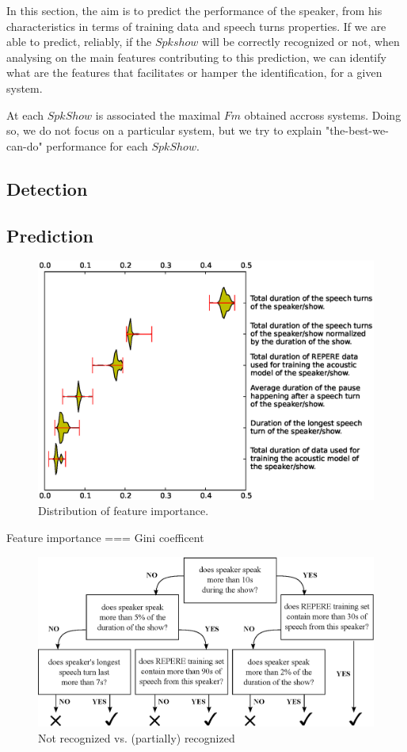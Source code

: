 In this section, the aim is to predict the performance of the speaker, from his characteristics in terms of training data and speech turns properties. If we are able to predict, reliably, if the $Spkshow$ will be correctly recognized or not, when analysing on the main features contributing to this prediction, we can identify what are the features that  facilitates or hamper the identification, for a given system.

At each $SpkShow$ is associated the maximal $Fm$ obtained accross systems. Doing so, we do not focus on a particular system, but we try to explain "the-best-we-can-do" performance for each $SpkShow$.

\subsection{Detection}


\subsection{Prediction}


\begin{figure}[t]
\centering
\includegraphics[width=\linewidth]{figures/violin.eps}
\caption{Distribution of feature importance.}
\label{fig:featureImportance}
\end{figure}


Feature importance === Gini coefficent~\cite{Breiman2001}


\begin{figure}[t]
\centering
\includegraphics[width=0.7\linewidth]{figures/tree.eps}
\caption{Not recognized vs. (partially) recognized}
\label{fig:tree}
\end{figure}

